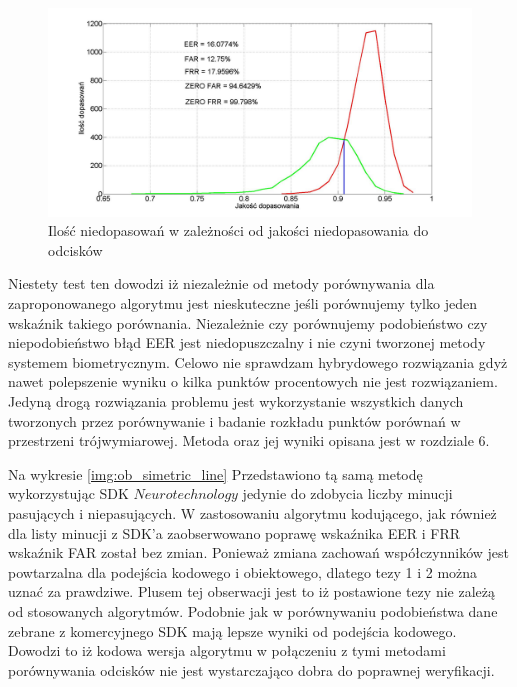 \begin{figure}[!htb]
    \begin{center}
		\includegraphics[angle=0,scale=0.27]{img/simetric_distance_code_line.jpg}
		\caption{Ilość niedopasowań w zależności od jakości niedopasowania do odcisków}
		\label{img:code_simetric_line}
    \end{center}
\end{figure} 
Niestety test ten dowodzi iż niezależnie od metody porównywania dla zaproponowanego algorytmu jest nieskuteczne jeśli porównujemy tylko jeden wskaźnik takiego porównania. Niezależnie czy porównujemy podobieństwo czy niepodobieństwo błąd EER jest niedopuszczalny i nie czyni tworzonej metody systemem biometrycznym. Celowo nie sprawdzam hybrydowego rozwiązania gdyż nawet polepszenie wyniku o kilka punktów procentowych nie jest rozwiązaniem. Jedyną drogą rozwiązania problemu jest wykorzystanie wszystkich danych tworzonych przez porównywanie i badanie rozkładu punktów porównań w przestrzeni trójwymiarowej. Metoda oraz jej wyniki opisana jest w rozdziale 6.
\vspace{.5cm}\par

Na wykresie \ref{img:ob_simetric_line} Przedstawiono tą samą metodę wykorzystując SDK $Neurotechnology$ jedynie do zdobycia liczby minucji pasujących i niepasujących. W zastosowaniu algorytmu kodującego, jak również dla listy minucji z SDK'a zaobserwowano poprawę wskaźnika EER i FRR wskaźnik FAR został bez zmian. Ponieważ zmiana zachowań współczynników jest powtarzalna dla podejścia kodowego i obiektowego, dlatego tezy 1 i 2 można uznać za prawdziwe. Plusem tej obserwacji jest to iż postawione tezy nie zależą od stosowanych algorytmów. Podobnie jak w porównywaniu podobieństwa dane zebrane z komercyjnego SDK mają lepsze wyniki od podejścia kodowego. Dowodzi to iż kodowa wersja algorytmu w połączeniu z tymi metodami porównywania odcisków nie jest wystarczająco dobra do poprawnej weryfikacji. 

